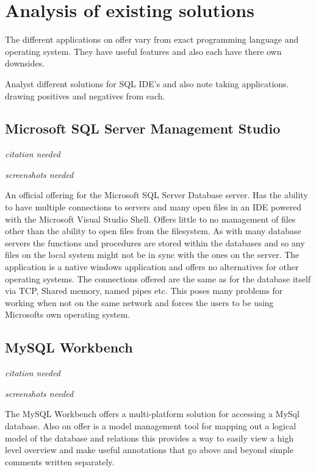 \section{Analysis of existing
solutions}\label{analysis-of-existing-solutions}

The different applications on offer vary from exact programming language
and operating system. They have useful features and also each have there
own downsides.

Analyst different solutions for SQL IDE's and also note taking
applications. drawing positives and negatives from each.

\subsection{Microsoft SQL Server Management
Studio}\label{microsoft-sql-server-management-studio}

\emph{citation needed}

\emph{screenshots needed}

An official offering for the Microsoft SQL Server Database server. Has
the ability to have multiple connections to servers and many open files
in an IDE powered with the Microsoft Visual Studio Shell. Offers little
to no management of files other than the ability to open files from the
filesystem. As with many database servers the functions and procedures
are stored within the databases and so any files on the local system
might not be in sync with the ones on the server. The application is a
native windows application and offers no alternatives for other
operating systems. The connections offered are the same as for the
database itself via TCP, Shared memory, named pipes etc. This poses many
problems for working when not on the same network and forces the users
to be using Microsofts own operating system.

\subsection{MySQL Workbench}\label{mysql-workbench}

\emph{citation needed}

\emph{screenshots needed}

The MySQL Workbench offers a multi-platform solution for accessing a
MySql database. Also on offer is a model management tool for mapping out
a logical model of the database and relations this provides a way to
easily view a high level overview and make useful annotations that go
above and beyond simple comments written separately.

